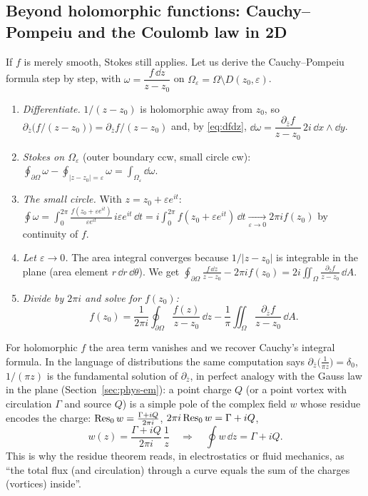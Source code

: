\subsection{Beyond holomorphic functions: Cauchy--Pompeiu and the Coulomb law in 2D}\label{sec:pompeiu}

If $f$ is merely smooth, Stokes still applies. Let us derive the Cauchy--Pompeiu formula step by step, with $\omega=\dfrac{f\,\dd z}{z-z_0}$ on $\Omega_\varepsilon=\Omega\setminus D(z_0,\varepsilon)$.
\begin{enumerate}
\item \emph{Differentiate.} $1/(z-z_0)$ is holomorphic away from $z_0$, so $\partial_{\bar z}\bigl(f/(z-z_0)\bigr)=\partial_{\bar z}f/(z-z_0)$ and, by \eqref{eq:dfdz}, $\dd\omega=\dfrac{\partial_{\bar z}f}{z-z_0}\,2i\,\dd x\wedge\dd y$.
\item \emph{Stokes on $\Omega_\varepsilon$} (outer boundary ccw, small circle cw): $\displaystyle\oint_{\partial\Omega}\omega-\oint_{|z-z_0|=\varepsilon}\omega=\int_{\Omega_\varepsilon}\dd\omega$.
\item \emph{The small circle.} With $z=z_0+\varepsilon e^{it}$: $\displaystyle\oint\omega=\int_0^{2\pi}\frac{f(z_0+\varepsilon e^{it})}{\varepsilon e^{it}}\,i\varepsilon e^{it}\,\dd t=i\int_0^{2\pi}f(z_0+\varepsilon e^{it})\,\dd t\xrightarrow[\varepsilon\to0]{}2\pi if(z_0)$ by continuity of $f$.
\item \emph{Let $\varepsilon\to0$.} The area integral converges because $1/|z-z_0|$ is integrable in the plane (area element $r\,\dd r\,\dd\theta$). We get $\displaystyle\oint_{\partial\Omega}\frac{f\,\dd z}{z-z_0}-2\pi if(z_0)=2i\iint_\Omega\frac{\partial_{\bar z}f}{z-z_0}\,\dd A$.
\item \emph{Divide by $2\pi i$ and solve for $f(z_0)$:}
\begin{equation}\label{eq:pompeiu}
f(z_0)=\frac1{2\pi i}\oint_{\partial\Omega}\frac{f(z)}{z-z_0}\,\dd z-\frac1\pi\iint_\Omega\frac{\partial_{\bar z}f}{z-z_0}\,\dd A .
\end{equation}
\end{enumerate}
For holomorphic $f$ the area term vanishes and we recover Cauchy's integral formula. In the language of distributions the same computation says $\partial_{\bar z}\bigl(\frac1{\pi z}\bigr)=\delta_0$, \ie $1/(\pi z)$ is the fundamental solution of $\partial_{\bar z}$, in perfect analogy with the Gauss law in the plane (Section~\ref{sec:phys-em}): a point charge $Q$ (or a point vortex with circulation $\Gamma$ and source $Q$) is a simple pole of the complex field $w$ whose residue encodes the charge: $\operatorname{Res}_0w=\frac{\Gamma+iQ}{2\pi i}$, \ie $2\pi i\operatorname{Res}_0w=\Gamma+iQ$,
\[
w(z)=\frac{\Gamma+iQ}{2\pi i}\,\frac1z\quad\Longrightarrow\quad\oint w\,\dd z=\Gamma+iQ .
\]
This is why the residue theorem reads, in electrostatics or fluid mechanics, as ``the total flux (and circulation) through a curve equals the sum of the charges (vortices) inside''.
